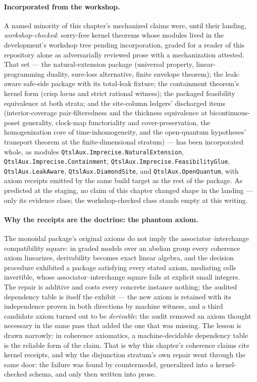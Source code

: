 \paragraph{Incorporated from the workshop.} A named minority of this
chapter's mechanized claims were, until their landing,
\emph{workshop-checked}: sorry-free kernel theorems whose modules
lived in the development's workshop tree pending incorporation,
graded for a reader of this repository alone as adversarially
reviewed prose with a mechanization attested. That set --- the
natural-extension package (universal property, linear-programming
duality, sure-loss alternative, finite envelope theorem); the
leak-aware safe-side package with its total-leak fixture; the
containment theorem's kernel form (crisp locus and strict rational
witness); the packaged feasibility equivalence at both strata; and
the site-column ledgers' discharged items (interior-coverage
pair-filteredness and the thickness equivalence at
bicontinuous-poset generality, clock-map functoriality and
cover-preservation, the homogenization core of time-inhomogeneity,
and the open-quantum hypotheses' transport theorem at the
finite-dimensional stratum) --- has been incorporated whole, as
modules \texttt{QtslAux.Imprecise.NaturalExtension},
\texttt{QtslAux.Imprecise.Containment},
\texttt{QtslAux.Imprecise.\allowbreak FeasibilityGlue},
\texttt{QtslAux.LeakAware}, \texttt{QtslAux.DiamondSite}, and
\texttt{QtslAux.\allowbreak OpenQuantum}, with axiom receipts emitted by the
same build target as the rest of the package. As predicted at the
staging, no claim of this chapter changed shape in the landing ---
only its evidence class; the workshop-checked class stands empty at
this writing.

\paragraph{Why the receipts are the doctrine: the phantom axiom.}
The monoidal package's original axioms do not imply the
associator--interchange compatibility square: in graded models over
an abelian group every coherence axiom linearizes, derivability
becomes exact linear algebra, and the decision procedure exhibited a
package satisfying every stated axiom, mediating cells invertible,
whose associator--interchange square fails at explicit small
integers. The repair is additive and
costs every concrete instance nothing; the audited dependency table
is itself the exhibit --- the new axiom is retained with its
independence proven in both directions by machine witness, and a
third candidate axiom turned out to be \emph{derivable}: the audit
removed an axiom thought necessary in the same pass that added the
one that was missing. The lesson is drawn narrowly: in coherence axiomatics, a
machine-decidable dependency table is the reliable form of the
claim. That is why this chapter's coherence claims cite kernel
receipts, and why the disjunction stratum's own repair went
through the same door: the failure was
found by countermodel, generalized into a kernel-checked schema,
and only then written into prose.


